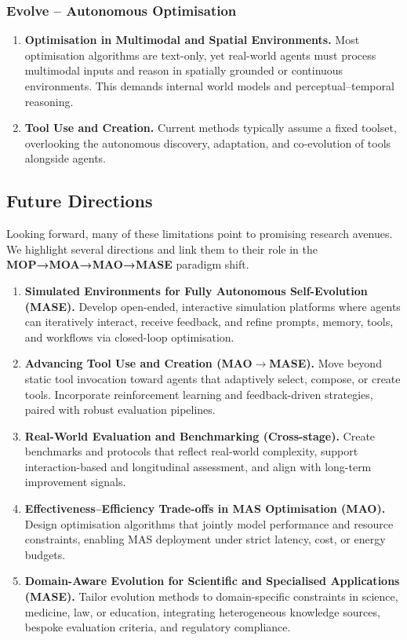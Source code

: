 \documentclass[]{selfevolagent}
\theoremstyle{plain}
\theoremstyle{definition}
\theoremstyle{remark}
\begin{document}
\subsubsection{Evolve – Autonomous Optimisation}
\begin{enumerate}[label=(\arabic*)]
    \item \textbf{Optimisation in Multimodal and Spatial Environments.} Most optimisation algorithms are text-only, yet real-world agents must process multimodal inputs and reason in spatially grounded or continuous environments. This demands internal world models and perceptual–temporal reasoning.
    \item \textbf{Tool Use and Creation.} Current methods typically assume a fixed toolset, overlooking the autonomous discovery, adaptation, and co-evolution of tools alongside agents.
\end{enumerate}

\subsection{Future Directions}

Looking forward, many of these limitations point to promising research avenues. We highlight several directions and link them to their role in the \textbf{MOP→MOA→MAO→MASE} paradigm shift.

\begin{enumerate}[label=(\arabic*)]
    \item \textbf{Simulated Environments for Fully Autonomous Self-Evolution (MASE).} Develop open-ended, interactive simulation platforms where agents can iteratively interact, receive feedback, and refine prompts, memory, tools, and workflows via closed-loop optimisation.
    \item \textbf{Advancing Tool Use and Creation (MAO$\rightarrow$MASE).} Move beyond static tool invocation toward agents that adaptively select, compose, or create tools. Incorporate reinforcement learning and feedback-driven strategies, paired with robust evaluation pipelines.
    \item \textbf{Real-World Evaluation and Benchmarking (Cross-stage).} Create benchmarks and protocols that reflect real-world complexity, support interaction-based and longitudinal assessment, and align with long-term improvement signals.
    \item \textbf{Effectiveness–Efficiency Trade-offs in MAS Optimisation (MAO).} Design optimisation algorithms that jointly model performance and resource constraints, enabling MAS deployment under strict latency, cost, or energy budgets.
    \item \textbf{Domain-Aware Evolution for Scientific and Specialised Applications (MASE).} Tailor evolution methods to domain-specific constraints in science, medicine, law, or education, integrating heterogeneous knowledge sources, bespoke evaluation criteria, and regulatory compliance.
\end{enumerate}
\end{document}
